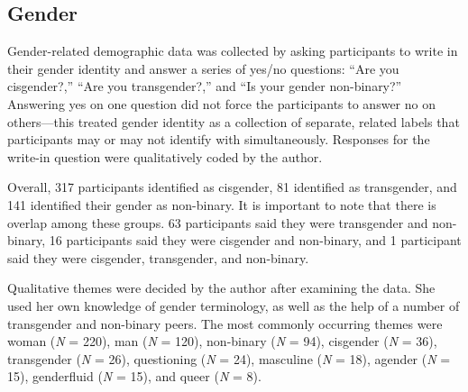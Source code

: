 \documentclass[12pt,twoside]{reedthesis}
\begin{document}
\hypertarget{gender}{%
\subsection{Gender}\label{gender}}

Gender-related demographic data was collected by asking participants to write in their gender identity and answer a series of yes/no questions: ``Are you cisgender?,'' ``Are you transgender?,'' and ``Is your gender non-binary?'' Answering yes on one question did not force the participants to answer no on others---this treated gender identity as a collection of separate, related labels that participants may or may not identify with simultaneously. Responses for the write-in question were qualitatively coded by the author.

Overall, 317 participants identified as cisgender, 81 identified as transgender, and 141 identified their gender as non-binary. It is important to note that there is overlap among these groups. 63 participants said they were transgender and non-binary, 16 participants said they were cisgender and non-binary, and 1 participant said they were cisgender, transgender, and non-binary.

Qualitative themes were decided by the author after examining the data. She used her own knowledge of gender terminology, as well as the help of a number of transgender and non-binary peers. The most commonly occurring themes were woman (\emph{N} = 220), man (\emph{N} = 120), non-binary (\emph{N} = 94), cisgender (\emph{N} = 36), transgender (\emph{N} = 26), questioning (\emph{N} = 24), masculine (\emph{N} = 18), agender (\emph{N} = 15), genderfluid (\emph{N} = 15), and queer (\emph{N} = 8).
\end{document}
